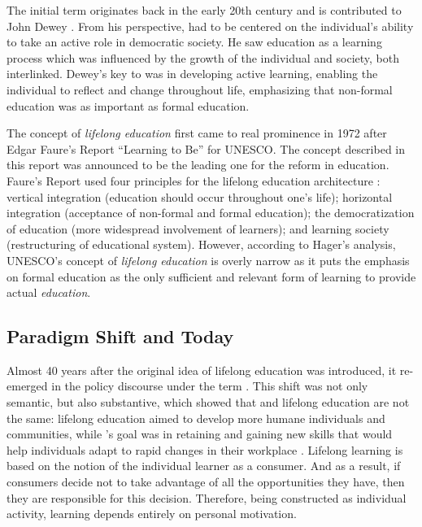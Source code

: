 The initial term \textit{\LLLsn} originates back in the early 20th century
and is contributed to John Dewey \citeyearpar{Dewey2004}. From his
perspective, \LLLs had to be centered on the individual's ability to take an
active role in democratic society. He saw education as a learning process which
was influenced by the growth of the individual and society, both interlinked.
Dewey's key to \LLLs was in developing active learning, enabling the individual
to reflect and change throughout life, emphasizing that non-formal education was
as important as formal education.

The concept of \textit{lifelong education} first came to real prominence in 1972
after Edgar Faure's Report ``Learning to Be'' for UNESCO. The concept described
in this report was announced to be the leading one for the reform in education.
Faure's Report used four principles for the lifelong education architecture
\citep{Faure1972}: vertical integration (education should occur throughout one's
life); horizontal integration (acceptance of non-formal and formal education);
the democratization of education (more widespread involvement of learners); and
learning society (restructuring of educational system). However, according to
Hager's \citeyearpar{Hager2011} analysis, UNESCO's concept of \textit{lifelong
education} is overly narrow as it puts the emphasis on formal education as the
only sufficient and relevant form of learning to provide actual
\textit{education}.

\subsection{Paradigm Shift and \LLLc Today}

Almost 40 years after the original idea of lifelong education was introduced, 
it re-emerged in the policy discourse under the term \LLLs \citep{Boshier2000}.
This shift was not only semantic, but also substantive, which showed that \LLLs
and lifelong education are not the same: lifelong education aimed to develop
more humane individuals and communities, while \LLLsn's goal was in retaining
and gaining new skills that would help individuals adapt to rapid changes in
their workplace \citep{Medel-Anonuevo2001}. Lifelong learning is based on the
notion of the individual learner as a consumer. And as a result, if consumers
decide not to take advantage of all the opportunities they have, then they are
responsible for this decision. Therefore, being constructed as individual
activity, learning depends entirely on personal motivation.

